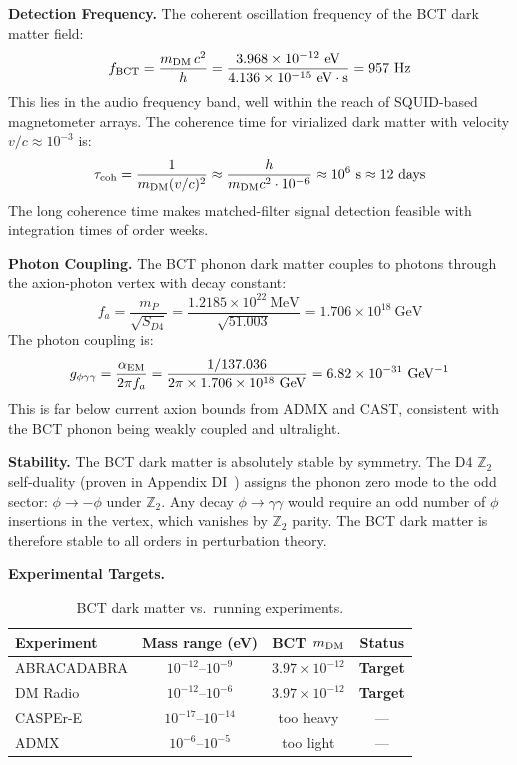 \documentclass[aps,prl,twocolumn,superscriptaddress,floatfix]{revtex4-2}
\begin{document}
\medskip
\noindent\textbf{Detection Frequency.}
The coherent oscillation frequency of the BCT dark matter field:
\begin{equation}
  f_{\rm BCT} = \frac{m_{\rm DM}\,c^2}{h}
  = \frac{3.968\times10^{-12}\ \mathrm{eV}}{4.136\times10^{-15}\ \mathrm{eV\cdot s}}
  = 957\ \mathrm{Hz}
  \label{eq:fBCT}
\end{equation}
This lies in the audio frequency band, well within the reach of SQUID-based
magnetometer arrays. The coherence time for virialized dark matter
with velocity $v/c \approx 10^{-3}$ is:
\begin{equation}
  \tau_{\rm coh} = \frac{1}{m_{\rm DM}(v/c)^2}
  \approx \frac{h}{m_{\rm DM} c^2 \cdot 10^{-6}}
  \approx 10^6\ \mathrm{s} \approx 12\ \mathrm{days}
  \label{eq:tcoh}
\end{equation}
The long coherence time makes matched-filter signal detection feasible
with integration times of order weeks.

\medskip
\noindent\textbf{Photon Coupling.}
The BCT phonon dark matter couples to photons through the axion-photon
vertex with decay constant:
\begin{equation}
  f_a = \frac{m_P}{\sqrt{S_{D4}}}
  = \frac{1.2185\times10^{22}\ \mathrm{MeV}}{\sqrt{51.003}}
  = 1.706\times10^{18}\ \mathrm{GeV}
  \label{eq:fa}
\end{equation}
The photon coupling is:
\begin{equation}
  g_{\phi\gamma\gamma} = \frac{\alpha_{\rm EM}}{2\pi f_a}
  = \frac{1/137.036}{2\pi \times 1.706\times10^{18}\ \mathrm{GeV}}
  = 6.82\times10^{-31}\ \mathrm{GeV}^{-1}
  \label{eq:gcoupling}
\end{equation}
This is far below current axion bounds from ADMX and CAST,
consistent with the BCT phonon being weakly coupled and ultralight.

\medskip
\noindent\textbf{Stability.}
The BCT dark matter is absolutely stable by symmetry.
The D4 $\mathbb{Z}_2$ self-duality (proven in Appendix DI~\cite{Monograph})
assigns the phonon zero mode to the odd sector: $\phi \to -\phi$ under
$\mathbb{Z}_2$. Any decay $\phi \to \gamma\gamma$ would require an odd number
of $\phi$ insertions in the vertex, which vanishes by $\mathbb{Z}_2$ parity.
The BCT dark matter is therefore stable to all orders in perturbation theory.

\medskip
\noindent\textbf{Experimental Targets.}
\begin{table}[h]
\centering
\caption{BCT dark matter vs.\ running experiments.}
\label{tab:expt}
\begin{tabular}{lccc}
\toprule
Experiment & Mass range (eV) & BCT $m_{\rm DM}$ & Status \\
\midrule
ABRACADABRA & $10^{-12}$--$10^{-9}$ & $3.97\times10^{-12}$ & \textbf{Target} \\
DM Radio & $10^{-12}$--$10^{-6}$ & $3.97\times10^{-12}$ & \textbf{Target} \\
CASPEr-E & $10^{-17}$--$10^{-14}$ & too heavy & — \\
ADMX & $10^{-6}$--$10^{-5}$ & too light & — \\
\bottomrule
\end{tabular}
\end{table}
\end{document}
